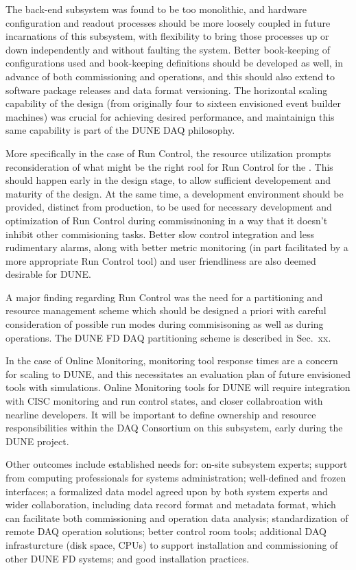 The back-end subsystem was found to be too monolithic, and hardware configuration
and readout processes should be more loosely coupled in future incarnations of
this subsystem, with flexibility to bring those processes up or down
independently and without faulting the system. Better book-keeping of
configurations used and book-keeping definitions should be developed as
well, in advance of both commissioning and operations, and this should also
extend to software package releases and data format versioning. The horizontal
scaling capability of the design (from originally four to sixteen envisioned event
builder machines) was crucial for achieving desired performance, and
maintainign this same capability is part of the DUNE DAQ philosophy.

More specifically in the case of Run Control, the resource utilization
prompts reconsideration of what might be the right rool for Run
Control for the  . This should happen early in
the design stage, to allow sufficient developement and maturity of the
design. At the same time, a development environment should be
provided, distinct from production, to be used for necessary
development and optimization of Run Control during commissinoning in a
way that it doesn't inhibit other commisioning tasks. Better slow
control integration and less rudimentary alarms, along with better
metric monitoring (in part facilitated by a more appropriate Run
Control tool) and user friendliness are also deemed desirable for DUNE. 

A major finding regarding Run Control was the need for a partitioning
and resource management scheme which should be designed a priori with careful
consideration of possible run modes during commisisoning as well as
during operations. The DUNE FD DAQ partitioning scheme is described in
Sec.~xx.

In the case of Online Monitoring, monitoring tool response times are a
concern for scaling to DUNE, and this necessitates an evaluation plan
of future envisioned tools with simulations. Online Monitoring tools
for DUNE will require integration with CISC monitoring and run control
states,  and closer collabroation with nearline developers. It will be
important to define ownership and resource responsibilities within the
DAQ Consortium on this
subsystem, early during the DUNE project.

Other outcomes include established needs for: on-site
subsystem experts; support from computing professionals
for systems administration; well-defined and frozen interfaces;
a formalized data model agreed upon by both system experts and wider
collaboration, including data record format and metadata format, which can facilitate both commissioning and operation
data analysis; standardization of remote DAQ operation solutions;
better control room tools; additional DAQ infrasturcture (disk
space, CPUs) to support installation and commissioning of other DUNE
FD systems; and good
installation practices.

